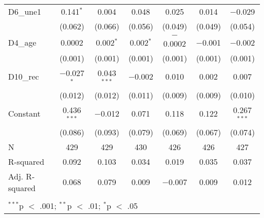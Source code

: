 \documentclass[
]{article}
\begin{document}
\begin{table}[!htbp]
\begin{tabular}{@{\extracolsep{5pt}}lcccccc}
  D6\_une1 & 0.141$^{*}$ & 0.004 & 0.048 & 0.025 & 0.014 & $-$0.029 \\ 
  & (0.062) & (0.066) & (0.056) & (0.049) & (0.049) & (0.054) \\ 
  D4\_age & 0.0002 & 0.002$^{*}$ & 0.002$^{*}$ & $-$0.0002 & $-$0.001 & $-$0.002 \\ 
  & (0.001) & (0.001) & (0.001) & (0.001) & (0.001) & (0.001) \\ 
  D10\_rec & $-$0.027$^{*}$ & 0.043$^{***}$ & $-$0.002 & 0.010 & 0.002 & 0.007 \\ 
  & (0.012) & (0.012) & (0.011) & (0.009) & (0.009) & (0.010) \\ 
  Constant & 0.436$^{***}$ & $-$0.012 & 0.071 & 0.118 & 0.122 & 0.267$^{***}$ \\ 
  & (0.086) & (0.093) & (0.079) & (0.069) & (0.067) & (0.074) \\ 
 N & 429 & 429 & 430 & 426 & 426 & 427 \\ 
R-squared & 0.092 & 0.103 & 0.034 & 0.019 & 0.035 & 0.037 \\ 
Adj. R-squared & 0.068 & 0.079 & 0.009 & $-$0.007 & 0.009 & 0.012 \\ 
\hline \\[-1.8ex] 
\multicolumn{7}{l}{$^{***}$p $<$ .001; $^{**}$p $<$ .01; $^{*}$p $<$ .05} \\ 
\end{tabular} 
\end{table}
\end{document}
